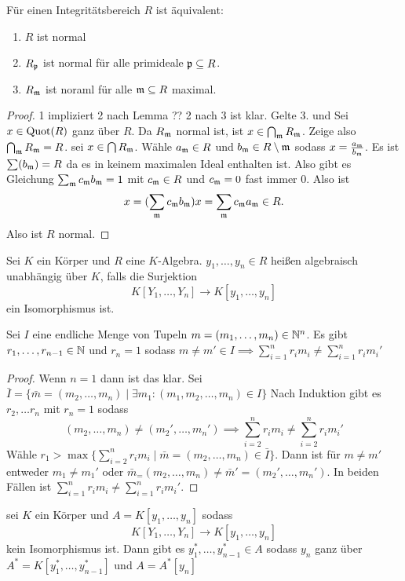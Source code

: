 \begin{Satz}
    Für einen Integritätsbereich $R$ ist äquivalent:
    \begin{enumerate}
        \item $R$ ist normal
        \item $R_{\mathfrak{p}}$ ist normal für alle primideale $\mathfrak{p}\subseteq R$.
        \item $R_{\mathfrak{m}}$ ist noraml für alle $\mathfrak{m}\subseteq R$ maximal.
    \end{enumerate}
\end{Satz}
\begin{proof}
    1 impliziert 2 nach Lemma ??
    2 nach 3 ist klar.
    Gelte 3. und Sei $x\in\operatorname{Quot}(R)$ ganz über $R$. Da $R_{\mathfrak{m}}$ normal ist, ist $x\in\bigcap_{\mathfrak{m}} R_{\mathfrak{m}}$. Zeige also $\bigcap_{\mathfrak{m}} R_{\mathfrak{m}}=R$.
    sei $x\in \bigcap R_{\mathfrak{m}}$.
    Wähle $a_{\mathfrak{m}}\in R$ und $b_{\mathfrak{m}} \in R\setminus\mathfrak{m}$ sodass $x=\frac{a_{\mathfrak{m}}}{b_{\mathfrak{m}}}$. Es ist $\sum(b_{\mathfrak{m}})=R$ da es in keinem maximalen Ideal enthalten ist. Also gibt es Gleichung $\sum_{\mathfrak{m}} c_{\mathfrak{m}} b_{\mathfrak{m}}=1$ mit $c_{\mathfrak{m}}\in R$ und $c_{\mathfrak{m}}=0$ fast immer $0$.
    Also ist $$x=(\sum_{\mathfrak{m}} c_{\mathfrak{m}} b_{\mathfrak{m}})x=\sum_{\mathfrak{m}} c_{\mathfrak{m}} a_{\mathfrak{m}}\in R.$$ Also ist $R$ normal.
\end{proof}
\begin{Def}
    Sei $K$ ein Körper und $R$ eine $K$-Algebra. $y_1,\dots,y_n\in R$ heißen algebraisch unabhängig über $K$, falls die Surjektion $$K[Y_1,\dots,Y_n]\to K[y_1,\dots,y_n]$$ ein Isomorphismus ist.
\end{Def}
\begin{Lemma}
    Sei $I$ eine endliche Menge von Tupeln $m=(m_1,\dots,m_n)\in \mathbb{N}^n$.
    Es gibt $r_1,\dots,r_{n-1}\in\mathbb{N}$ und $r_n=1$ sodass 
    $m\neq m'\in I\implies \sum_{i=1}^nr_im_i\neq \sum_{i=1}^nr_im_i'$
\end{Lemma}
\begin{proof}
    Wenn $n=1$ dann ist das klar.
    Sei $\bar I=\{\bar m=(m_2,\dots,m_n)\mid \exists m_1\colon (m_1,m_2,\dots,m_n)\in I\}$
    Nach Induktion gibt es $r_2,\dots r_n$ mit $r_n=1$ sodass $$(m_2,\dots,m_n)\neq (m_2',\dots,m_n')\implies \sum_{i=2}^nr_im_i\neq \sum_{i=2}^nr_im_i'$$
    Wähle $r_1>\max\{\sum_{i=2}^nr_im_i\mid \bar m=(m_2,\dots,m_n)\in \bar I\}$.
    Dann ist für $m\neq m'$ entweder $m_1\neq m_1'$ oder $\bar m_=(m_2,\dots,m_n)\neq \bar m'=(m_2',\dots,m_n')$.
    In beiden Fällen ist $\sum_{i=1}^nr_im_i\neq \sum_{i=1}^nr_i m_i'$.
\end{proof}
\begin{Lemma}
    sei $K$ ein Körper und $A=K[y_1,\dots,y_n]$ sodass $$K[Y_1,\dots,Y_n]\to K[y_1,\dots,y_n]$$ kein Isomorphismus ist. Dann gibt es $y_1^*,\dots,y_{n-1}^*\in A$ sodass $y_n$ ganz über $A^*=K[y_1^*,\dots,y_{n-1}^*]$ und $A=A^*[y_n]$
\end{Lemma}

